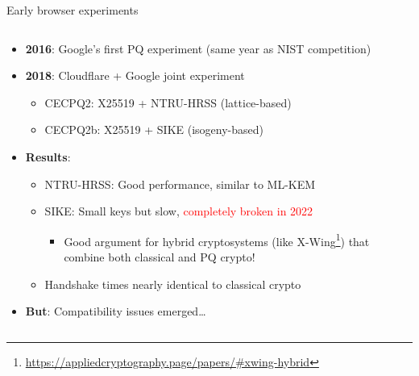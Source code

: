 \documentclass[aspectratio=169, lualatex, handout]{beamer}
\begin{document}
\begin{frame}{Early browser experiments}
	\begin{columns}[c]
		\begin{column}{1\textwidth}
			\begin{itemize}
				\item \textbf{2016}: Google's first PQ experiment (same year as NIST competition)
				\item \textbf{2018}: Cloudflare + Google joint experiment
				      \begin{itemize}
					      \item CECPQ2: X25519 + NTRU-HRSS (lattice-based)
					      \item CECPQ2b: X25519 + SIKE (isogeny-based)
				      \end{itemize}
				\item \textbf{Results}:
				      \begin{itemize}
					      \item NTRU-HRSS: Good performance, similar to ML-KEM
					      \item SIKE: Small keys but slow, \textcolor{red}{completely broken in 2022}
					            \begin{itemize}
						            \item Good argument for hybrid cryptosystems (like X-Wing\footnote{\url{https://appliedcryptography.page/papers/\#xwing-hybrid}}) that combine both classical and PQ crypto!
					            \end{itemize}
					      \item Handshake times nearly identical to classical crypto
				      \end{itemize}
				\item \textbf{But}: Compatibility issues emerged\ldots
			\end{itemize}
		\end{column}
	\end{columns}
\end{frame}
\end{document}
